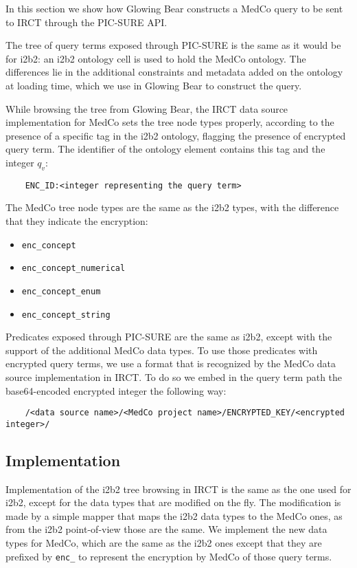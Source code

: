 In this section we show how Glowing Bear constructs a MedCo query to be sent to IRCT through the PIC-SURE API.

The tree of query terms exposed through PIC-SURE is the same as it would be for i2b2: an i2b2 ontology cell is used to hold the MedCo ontology. 
The differences lie in the additional constraints and metadata added on the ontology at loading time, which we use in Glowing Bear to construct the query.

While browsing the tree from Glowing Bear, the IRCT data source implementation for MedCo sets the tree node types properly, according to the presence of a specific tag in the i2b2 ontology, flagging the presence of encrypted query term.
The identifier of the ontology element contains this tag and the integer $q_v$:
\begin{verbatim}
    ENC_ID:<integer representing the query term>
\end{verbatim}

The MedCo tree node types are the same as the i2b2 types, with the difference that they indicate the encryption:
\begin{itemize}    
    \setlength\itemsep{0em}

    \item \verb|enc_concept|
    \item \verb|enc_concept_numerical|
    \item \verb|enc_concept_enum|
    \item \verb|enc_concept_string|
\end{itemize}

Predicates exposed through PIC-SURE are the same as i2b2, except with the support of the additional MedCo data types.
To use those predicates with encrypted query terms, we use a format that is recognized by the MedCo data source implementation in IRCT. 
To do so we embed in the query term path the base64-encoded encrypted integer the following way:
\begin{verbatim}
    /<data source name>/<MedCo project name>/ENCRYPTED_KEY/<encrypted integer>/
\end{verbatim}


\subsection*{Implementation}

Implementation of the i2b2 tree browsing in IRCT is the same as the one used for i2b2, except for the data types that are modified on the fly.
The modification is made by a simple mapper that maps the i2b2 data types to the MedCo ones, as from the i2b2 point-of-view those are the same.
We implement the new data types for MedCo, which are the same as the i2b2 ones except that they are prefixed by \verb|enc_| to represent the encryption by MedCo of those query terms.

